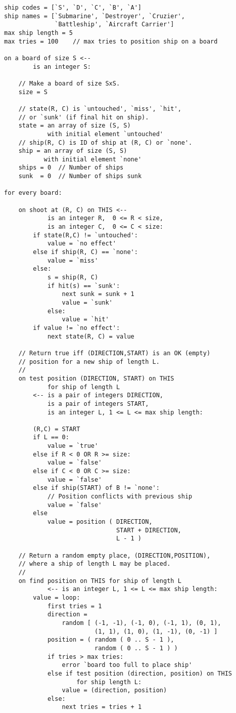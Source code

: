 \documentclass[12pt]{article}
\begin{document}
\begin{verbatim}
ship codes = [`S', `D', `C', `B', `A']
ship names = [`Submarine', `Destroyer', `Cruzier',
              `Battleship', `Aircraft Carrier']
max ship length = 5
max tries = 100    // max tries to position ship on a board

on a board of size S <--
        is an integer S:

    // Make a board of size SxS.
    size = S

    // state(R, C) is `untouched', `miss', `hit',
    // or `sunk' (if final hit on ship).
    state = an array of size (S, S)
            with initial element `untouched'
    // ship(R, C) is ID of ship at (R, C) or `none'.
    ship = an array of size (S, S)
           with initial element `none'
    ships = 0  // Number of ships
    sunk  = 0  // Number of ships sunk

for every board:

    on shoot at (R, C) on THIS <--
            is an integer R,  0 <= R < size,
            is an integer C,  0 <= C < size:
        if state(R,C) != `untouched':
            value = `no effect'
        else if ship(R, C) == `none':
            value = `miss'
        else:
            s = ship(R, C)
            if hit(s) == `sunk':
                next sunk = sunk + 1
                value = `sunk'
            else:
                value = `hit'
        if value != `no effect':
            next state(R, C) = value

    // Return true iff (DIRECTION,START) is an OK (empty)
    // position for a new ship of length L.
    //
    on test position (DIRECTION, START) on THIS
            for ship of length L
        <-- is a pair of integers DIRECTION,
            is a pair of integers START,
            is an integer L, 1 <= L <= max ship length:

        (R,C) = START
        if L == 0:
            value = `true'
        else if R < 0 OR R >= size:
            value = `false'
        else if C < 0 OR C >= size:
            value = `false'
        else if ship(START) of B != `none':
            // Position conflicts with previous ship
            value = `false'
        else
            value = position ( DIRECTION,
                               START + DIRECTION,
                               L - 1 )

    // Return a random empty place, (DIRECTION,POSITION),
    // where a ship of length L may be placed.
    //
    on find position on THIS for ship of length L
            <-- is an integer L, 1 <= L <= max ship length:
        value = loop:
            first tries = 1
            direction =
                random [ (-1, -1), (-1, 0), (-1, 1), (0, 1),
                         (1, 1), (1, 0), (1, -1), (0, -1) ]
            position = ( random ( 0 .. S - 1 ),
                         random ( 0 .. S - 1 ) )
            if tries > max tries:
                error `board too full to place ship'
            else if test position (direction, position) on THIS
                    for ship length L:
                value = (direction, position)
            else:
                next tries = tries + 1


\end{verbatim}
\end{document}
